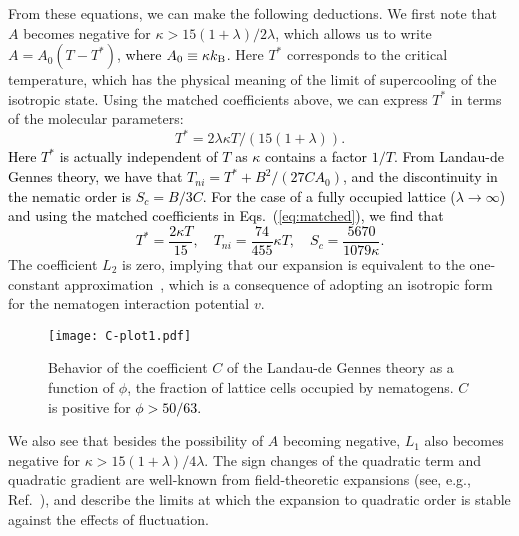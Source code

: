 \documentclass[jcp,aps,twocolumn,showpacs,supergroupedaddress,epsfig,amsmath,amssymb,eqsecnum]{revtex4}
\newcommand{\be}{\begin{equation}}
\newcommand{\ee}{\end{equation}}
\newcommand{\bing}[1]{\textcolor{black}{#1}}
\begin{document}
From these equations, we can make the following deductions. We first note that $A$ becomes negative for $\kappa > 15(1+\lambda)/2\lambda$, which allows us to write $A = A_0 (T - T^*)$, \bing{where $A_0 \equiv \kappa k_{{\rm B}}$.} 
Here $T^*$ corresponds to the critical temperature, which has the physical meaning of the limit of supercooling of the isotropic state. Using the matched coefficients above, we can express $T^*$ in terms of the molecular parameters: 
\be
\label{eq:T*}
T^* = 2\lambda \kappa T/(15(1+\lambda)).
\ee
\bing{Here $T^*$ is actually independent of $T$ as $\kappa$ contains a factor $1/T$. From Landau-de Gennes theory, we have that $T_{ni} = T^* + B^2/(27 C A_0)$, and the discontinuity in the nematic order is $S_c = B/3C$. For the case of a fully occupied lattice ($\lambda \rightarrow \infty$) and using the matched coefficients in Eqs.~(\ref{eq:matched}), we find that 
\be
T^* = \frac{2\kappa T}{15}, \quad T_{ni} = \frac{74}{455} \kappa T, \quad S_c = \frac{5670}{1079\kappa}. 
\ee}
The coefficient $L_2$ is zero, implying that our expansion is equivalent to the one-constant approximation~\cite{degennes-prost}, which is a consequence of adopting an isotropic form for the nematogen interaction potential $v$.
\begin{figure}[h]
\centering
  \texttt{[image: C-plot1.pdf]}
  \caption{Behavior of the coefficient $C$ of the Landau-de Gennes theory as a function of $\phi$, the fraction of lattice cells occupied by nematogens. $C$ is positive for \bing{$\phi > 50/63$.}} 
  \label{fig:C}
\end{figure}
We also see that besides the possibility of $A$ becoming negative, $L_1$  also becomes negative
 for $\kappa > 15(1+\lambda)/4\lambda$. The sign changes of the quadratic term and quadratic gradient are well-known from field-theoretic expansions (see, e.g., Ref.~\cite{altland-simons}), and describe the limits at which the expansion to quadratic order is stable against the effects of fluctuation. 
 
\end{document}
